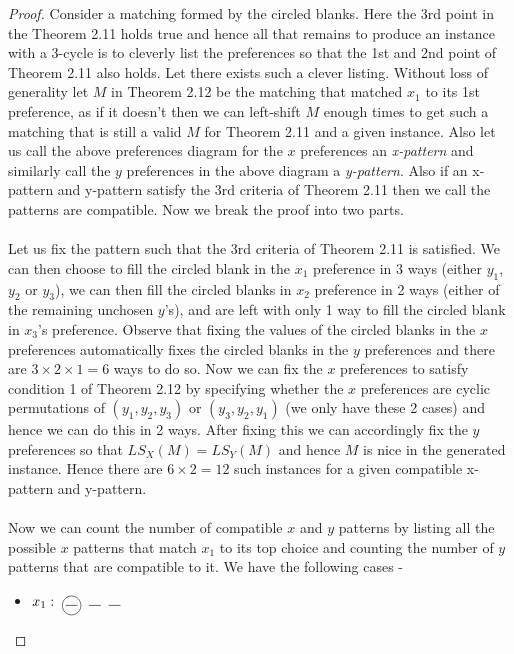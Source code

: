 \documentclass[a4paper,10pt]{article}
\theoremstyle{plain} %
\theoremstyle{plain} %
\newcommand*\circled[1]{\tikz[baseline=(char.base)]{
            \node[shape=circle,draw,inner sep=2pt] (char) {#1};}}
\begin{document}
\begin{proof}
    Consider a matching formed by the circled blanks. Here the 3rd point in the Theorem 2.11 holds true and hence all that remains to produce an instance with a 3-cycle is to cleverly list the preferences so that the 1st and 2nd point of Theorem 2.11 also holds. Let there exists such a clever listing. Without loss of generality let $M$ in Theorem 2.12 be the matching that matched $x_1$ to its 1st preference, as if it doesn't then we can left-shift $M$ enough times to get such a matching that is still a valid $M$ for Theorem 2.11 and a given instance. Also let us call the above preferences diagram for the $x$ preferences an \textit{x-pattern} and similarly call the $y$ preferences in the above diagram a \textit{y-pattern}. Also if an x-pattern and y-pattern satisfy the 3rd criteria of Theorem 2.11 then we call the patterns are compatible. Now we break the proof into two parts.
    \\ \\
    Let us fix the pattern such that the 3rd criteria of Theorem 2.11 is satisfied. We can then choose to fill the circled blank in the $x_1$ preference in 3 ways (either $y_1$, $y_2$ or $y_3$), we can then fill the circled blanks in $x_2$ preference in 2 ways (either of the remaining unchosen $y$'s), and are left with only 1 way to fill the circled blank in $x_3$'s preference. Observe that fixing the values of the circled blanks in the $x$ preferences automatically fixes the circled blanks in the $y$ preferences and there are $3 \times 2 \times 1 = 6$ ways to do so. Now we can fix the $x$ preferences to satisfy condition 1 of Theorem 2.12 by specifying whether the $x$ preferences are cyclic permutations of $(y_1, y_2, y_3)$ or $(y_3, y_2, y_1)$ (we only have these 2 cases) and hence we can do this in 2 ways. After fixing this we can accordingly fix the $y$ preferences so that $LS_X(M) = LS_Y(M)$ and hence $M$ is nice in the generated instance. Hence there are $6 \times 2 = 12$ such instances for a given compatible x-pattern and y-pattern.
    \\ \\
    Now we can count the number of compatible $x$ and $y$ patterns by listing all the possible $x$ patterns that match $x_1$ to its top choice and counting the number of $y$ patterns that are compatible to it. We have the following cases -
    \begin{itemize}
        \item 
        $x_1: \; \circled{\rule{0.3cm}{0.15mm}} \; \; \rule{0.3cm}{0.15mm} \; \; \rule{0.3cm}{0.15mm}$ \\

\end{itemize}
\end{proof}
\end{document}
